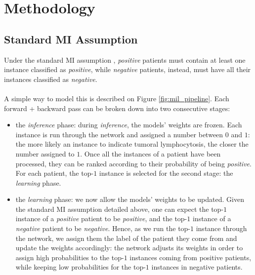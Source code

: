 \documentclass[final]{cvpr}
\begin{document}
	\section{Methodology}
	\label{sec:method}
	
	\subsection{Standard MI Assumption}
	\label{sec:standardMIL}
	
	Under the standard MI assumption \cite{stdMIL1, stdMIL2}, \emph{positive} patients must contain at least one instance classified as \emph{positive}, while \emph{negative} patients, instead, must have all their instances classified as \emph{negative}.\\
	\\
	A simple way to model this is described on Figure \ref{fig:mil_pipeline}. Each forward + backward pass can be broken down into two consecutive stages: 
	
	\begin{itemize}
		\setlength\itemsep{-.0em}
		\item the \emph{inference} phase: during \emph{inference}, the models' weights are frozen. Each instance is run through the network and assigned a number between $0$ and $1$: the more likely an instance to indicate tumoral lymphocytosis, the closer the number assigned to $1$. Once all the instances of a patient have been processed, they can be ranked according to their probability of being \emph{positive}. For each patient, the top-$1$ instance is selected for the second stage: the \emph{learning} phase.
		\item the \emph{learning} phase: we now allow the models' weights to be updated. Given the standard MI assumption detailed above, one can expect the top-$1$ instance of a \emph{positive} patient to be \emph{positive}, and the top-$1$ instance of a \emph{negative} patient to be \emph{negative}. Hence, as we run the top-$1$ instance through the network, we assign them the label of the patient they come from and update the weights accordingly: the network adjusts its weights in order to assign high probabilities to the top-$1$ instances coming from positive patients, while keeping low probabilities for the top-$1$ instances in negative patients. 
	\end{itemize}
\end{document}
